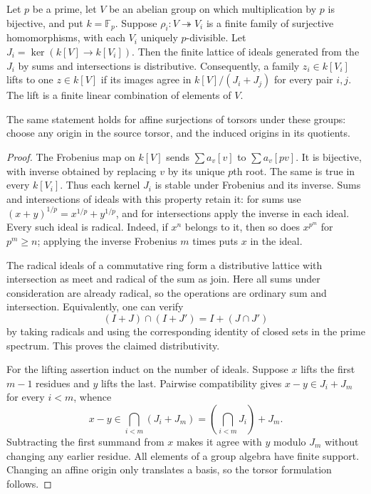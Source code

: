 \begin{lemma}
\label{C4:perfect-marginals}
Let $p$ be a prime, let $V$ be an abelian group on which multiplication
by $p$ is bijective, and put $k=\mathbb F_p$. Suppose
$\rho_i:V\twoheadrightarrow V_i$ is a finite family of surjective
homomorphisms, with each $V_i$ uniquely $p$-divisible. Let
$J_i=\ker(k[V]\to k[V_i])$. Then the finite lattice of ideals generated
from the $J_i$ by sums and intersections is distributive. Consequently,
a family $z_i\in k[V_i]$ lifts to one $z\in k[V]$ if its images agree
in $k[V]/(J_i+J_j)$ for every pair $i,j$. The lift is a finite linear
combination of elements of $V$.

The same statement holds for affine surjections of torsors under these
groups: choose any origin in the source torsor, and the induced origins
in its quotients.
\end{lemma}
\begin{proof}
The Frobenius map on $k[V]$ sends $\sum a_v[v]$ to
$\sum a_v[pv]$. It is bijective, with inverse obtained by replacing
$v$ by its unique $p$th root. The same is true in every $k[V_i]$.
Thus each kernel $J_i$ is stable under Frobenius and its inverse.
Sums and intersections of ideals with this property retain it:
for sums use $(x+y)^{1/p}=x^{1/p}+y^{1/p}$, and for intersections
apply the inverse in each ideal. Every such ideal is radical. Indeed,
if $x^n$ belongs to it, then so does $x^{p^m}$ for $p^m\geq n$;
applying the inverse Frobenius $m$ times puts $x$ in the ideal.

The radical ideals of a commutative ring form a distributive lattice
with intersection as meet and radical of the sum as join. Here all
sums under consideration are already radical, so the operations are
ordinary sum and intersection. Equivalently, one can verify
\[
 (I+J)\cap(I+J')=I+(J\cap J')
\]
by taking radicals and using the corresponding identity of closed
sets in the prime spectrum. This proves the claimed distributivity.

For the lifting assertion induct on the number of ideals. Suppose
$x$ lifts the first $m-1$ residues and $y$ lifts the last. Pairwise
compatibility gives $x-y\in J_i+J_m$ for every $i<m$, whence
\[
 x-y\in\bigcap_{i<m}(J_i+J_m)
      =\left(\bigcap_{i<m}J_i\right)+J_m.
\]
Subtracting the first summand from $x$ makes it agree with $y$ modulo
$J_m$ without changing any earlier residue. All elements of a group
algebra have finite support. Changing an affine origin only translates
a basis, so the torsor formulation follows.
\end{proof}

